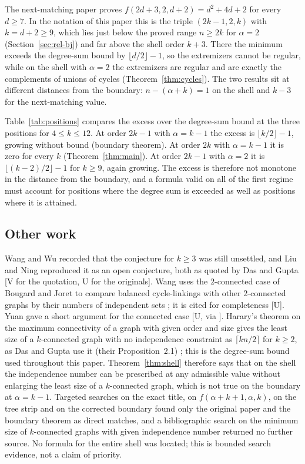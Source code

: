 The next-matching paper \cite{Next} proves $f(2d+3,2,d+2)=d^2+4d+2$ for every $d\ge7$.
In the notation of this paper this is the triple $(2k-1,2,k)$ with $k=d+2\ge9$, which lies just below the proved range $n\ge2k$ for $\alpha=2$ (Section~\ref{sec:rel-bj}) and far above the shell order $k+3$.
There the minimum exceeds the degree-sum bound by $\lfloor d/2\rfloor-1$, so the extremizers cannot be regular, while on the shell with $\alpha=2$ the extremizers are regular and are exactly the complements of unions of cycles (Theorem~\ref{thm:cycles}).
The two results sit at different distances from the boundary: $n-(\alpha+k)=1$ on the shell and $k-3$ for the next-matching value.



Table~\ref{tab:positions} compares the excess over the degree-sum bound at the three positions for $4\le k\le12$.
At order $2k-1$ with $\alpha=k-1$ the excess is $\lfloor k/2\rfloor-1$, growing without bound (boundary theorem).
At order $2k$ with $\alpha=k-1$ it is zero for every $k$ (Theorem~\ref{thm:main}).
At order $2k-1$ with $\alpha=2$ it is $\lfloor(k-2)/2\rfloor-1$ for $k\ge9$, again growing.
The excess is therefore not monotone in the distance from the boundary, and a formula valid on all of the first regime must account for positions where the degree sum is exceeded as well as positions where it is attained.

\subsection{Other work}\label{sec:rel-other}

Wang and Wu recorded that the conjecture for $k\ge3$ was still unsettled, and Liu and Ning reproduced it as an open conjecture, both as quoted by Das and Gupta \cite{WangWu,LiuNing,DG} [V for the quotation, U for the originals].
Wang uses the $2$-connected case of Bougard and Joret to compare balanced cycle-linkings with other $2$-connected graphs by their numbers of independent sets \cite{Wang}; it is cited for completeness [U].
Yuan gave a short argument for the connected case \cite{Yuan} [U, via \cite{DG}].
Harary's theorem on the maximum connectivity of a graph with given order and size gives the least size of a $k$-connected graph with no independence constraint as $\lceil kn/2\rceil$ for $k\ge2$, as Das and Gupta use it (their Proposition~2.1) \cite{Harary,DG}; this is the degree-sum bound used throughout this paper.
Theorem~\ref{thm:shell} therefore says that on the shell the independence number can be prescribed at any admissible value without enlarging the least size of a $k$-connected graph, which is not true on the boundary at $\alpha=k-1$.
Targeted searches on the exact title, on $f(\alpha+k+1,\alpha,k)$, on the tree strip and on the corrected boundary found only the original paper and the boundary theorem as direct matches, and a bibliographic search on the minimum size of $k$-connected graphs with given independence number returned no further source.
No formula for the entire shell was located; this is bounded search evidence, not a claim of priority.
